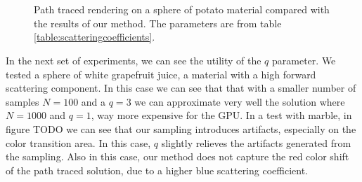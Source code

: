 \begin{figure}
{}
 \\
 \\
\label{fig:pathpotato}
\caption{Path traced rendering on a sphere of potato material compared with the results of our method. The parameters are from table \ref{table:scatteringcoefficients}.}
\end{figure}
 
In the next set of experiments, we can see the utility of the $q$ parameter. We tested a sphere of white grapefruit juice, a material with a high forward scattering component. In this case we can see that that with a smaller number of samples $N = 100$ and a $q = 3$ we can approximate very well the solution where $N = 1000$ and $q = 1$, way more expensive for the GPU. In a test with marble, in figure TODO we can see that our sampling introduces artifacts, especially on the color transition area. In this case, $q$ slightly relieves the artifacts generated from the sampling. Also in this case, our method does not capture the red color shift of the path traced solution, due to a higher blue scattering coefficient.

